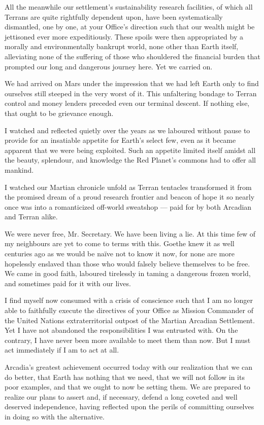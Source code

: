 All the meanwhile our settlement's sustainability research facilities, of which all Terrans are quite rightfully dependent upon, have been systematically dismantled, one by one, at your Office's direction such that our wealth might be jettisoned ever more expeditiously. These spoils were then appropriated by a morally and environmentally bankrupt world, none other than Earth itself, alleviating none of the suffering of those who shouldered the financial burden that prompted our long and dangerous journey here. Yet we carried on.

We had arrived on Mars under the impression that we had left Earth only to find ourselves still steeped in the very worst of it. This unfaltering bondage to Terran control and money lenders preceded even our terminal descent. If nothing else, that ought to be grievance enough.

I watched and reflected quietly over the years as we laboured without pause to provide for an insatiable appetite for Earth's select few, even as it became apparent that we were being exploited. Such an appetite limited itself amidst all the beauty, splendour, and knowledge the Red Planet's commons had to offer all mankind.

I watched our Martian chronicle unfold as Terran tentacles transformed it from the promised dream of a proud research frontier and beacon of hope it so nearly once was into a romanticized off-world sweatshop — paid for by both Arcadian and Terran alike.

We were never free, Mr. Secretary. We have been living a lie. At this time few of my neighbours are yet to come to terms with this. Goethe knew it as well centuries ago as we would be naïve not to know it now, for none are more hopelessly enslaved than those who would falsely believe themselves to be free. We came in good faith, laboured tirelessly in taming a dangerous frozen world, and sometimes paid for it with our lives.

I find myself now consumed with a crisis of conscience such that I am no longer able to faithfully execute the directives of your Office as Mission Commander of the United Nations extraterritorial outpost of the Martian Arcadian Settlement. Yet I have not abandoned the responsibilities I was entrusted with. On the contrary, I have never been more available to meet them than now. But I must act immediately if I am to act at all.

Arcadia's greatest achievement occurred today with our realization that we can do better, that Earth has nothing that we need, that we will not follow in its poor examples, and that we ought to now be setting them. We are prepared to realize our plans to assert and, if necessary, defend a long coveted and well deserved independence, having reflected upon the perils of committing ourselves in doing so with the alternative.

